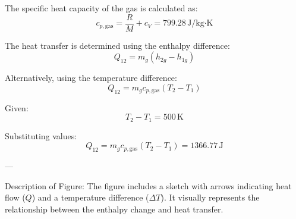 The specific heat capacity of the gas is calculated as:  
\[
c_{p,\text{gas}} = \frac{R}{M} + c_V = 799.28 \, \text{J/kg·K}
\]

The heat transfer is determined using the enthalpy difference:  
\[
Q_{12} = m_g (h_{2g} - h_{1g})
\]

Alternatively, using the temperature difference:  
\[
Q_{12} = m_g c_{p,\text{gas}} (T_2 - T_1)
\]

Given:  
\[
T_2 - T_1 = 500 \, \text{K}
\]

Substituting values:  
\[
Q_{12} = m_g c_{p,\text{gas}} (T_2 - T_1) = 1366.77 \, \text{J}
\]

---

Description of Figure:  
The figure includes a sketch with arrows indicating heat flow (\( Q \)) and a temperature difference (\( \Delta T \)). It visually represents the relationship between the enthalpy change and heat transfer.